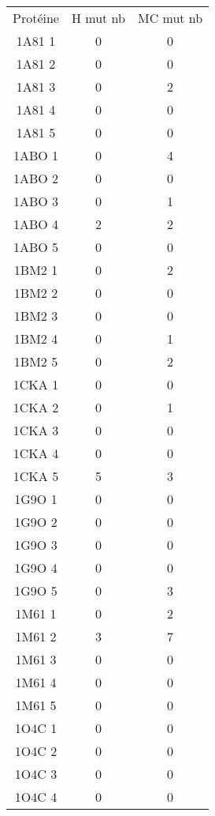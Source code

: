     \begin{table}[h]
      \centering

      \begin{tabular}{ccc}

        \toprule
        Protéine & H mut nb & MC mut nb \\
        \cmidrule{1-3}
        1A81 1 & 0  & 0 \\    
        1A81 2 & 0  & 0 \\
        1A81 3 & 0  & 2 \\
        1A81 4 & 0  & 0 \\
        1A81 5 & 0  & 0 \\
        1ABO 1 & 0  & 4 \\ 
        1ABO 2 & 0  & 0 \\
        1ABO 3 & 0  & 1 \\
        1ABO 4 & 2  & 2 \\
        1ABO 5 & 0  & 0 \\
        1BM2 1 & 0  & 2 \\
        1BM2 2 & 0  & 0 \\
        1BM2 3 & 0  & 0 \\
        1BM2 4 & 0  & 1 \\
        1BM2 5 & 0  & 2 \\
        1CKA 1 & 0  & 0 \\
        1CKA 2 & 0  & 1 \\
        1CKA 3 & 0  & 0 \\
        1CKA 4 & 0  & 0 \\
        1CKA 5 & 5  & 3 \\
        1G9O 1 & 0  & 0 \\
        1G9O 2 & 0  & 0 \\
        1G9O 3 & 0  & 0 \\
        1G9O 4 & 0  & 0 \\
        1G9O 5 & 0  & 3 \\
        1M61 1 & 0  & 2 \\
        1M61 2 & 3  & 7 \\
        1M61 3 & 0  & 0 \\
        1M61 4 & 0  & 0 \\
        1M61 5 & 0  & 0 \\
        1O4C 1 & 0  & 0 \\
        1O4C 2 & 0  & 0 \\
        1O4C 3 & 0  & 0 \\
        1O4C 4 & 0  & 0 \\

\end{tabular}
\end{table}

